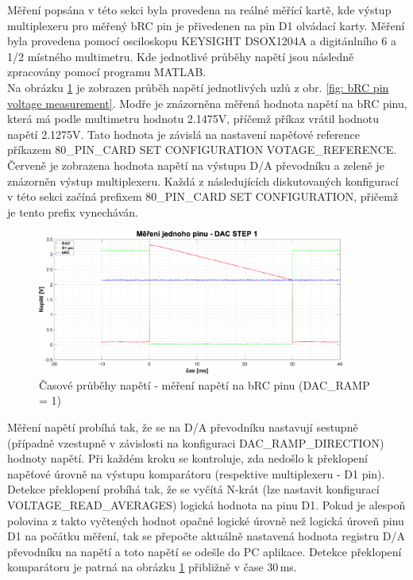 Měření popsána v této sekci byla provedena na reálné měřící kartě, kde výstup multiplexeru pro měřený bRC pin je přivedenen na pin D1 olvádací karty. Měření byla provedena pomocí
osciloskopu KEYSIGHT DSOX1204A a digitánlního 6 a 1/2 místného multimetru. Kde jednotlivé průběhy napětí jsou následně zpracovány pomocí programu MATLAB.\\

Na obrázku \ref{fig: bRC pin voltage measurement DACRAMP1} je zobrazen průběh napětí jednotlivých uzlů z obr. \ref{fig: bRC pin voltage measurement}. Modře je znázorněna měřená hodnota napětí na bRC pinu,
která má podle multimetru hodnotu 2.1475V, příčemž příkaz vrátil hodnotu napětí 2.1275V. Tato hodnota je závislá na nastavení napěťové reference příkazem 80\_PIN\_CARD SET CONFIGURATION VOTAGE\_REFERENCE.\\

Červeně je zobrazena hodnota napětí na výstupu D/A převodníku a zeleně je znázorněn výstup multiplexeru. 
Každá z následujících diskutovaných konfigurací v této sekci začíná prefixem 80\_PIN\_CARD SET CONFIGURATION, přičemž je tento prefix vynecháván.

\begin{figure}[ht!]
    \centering
    \includegraphics[width = 0.9\textwidth]{obrazky/matlab_generated/pin_step1.eps}
    \caption{Časové průběhy napětí - měření napětí na bRC pinu (DAC\_RAMP = 1)}
    \label{fig: bRC pin voltage measurement DACRAMP1}
\end{figure}

Měření napětí probíhá tak, že se na D/A převodníku nastavují sestupně (případně vzestupně v závislosti na konfiguraci DAC\_RAMP\_DIRECTION) hodnoty napětí. Při každém kroku se kontroluje,
zda nedošlo k překlopení napěťové úrovně na výstupu komparátoru (respektive multiplexeru - D1 pin).
Detekce překlopení probíhá tak, že se vyčítá N-krát (lze nastavit konfigurací VOLTAGE\_READ\_AVERAGES) logická hodnota na pinu D1.
Pokud je alespoň polovina z takto vyčtených hodnot opačné logické úrovně než logická úroveň pinu D1 na počátku měření,
tak se přepočte aktuálně nastavená hodnota registru D/A převodníku na napětí a toto napětí se odešle do PC aplikace.
Detekce překlopení komparátoru je patrná na obrázku \ref{fig: bRC pin voltage measurement DACRAMP1}
přibližně v čase 30\,ms.

